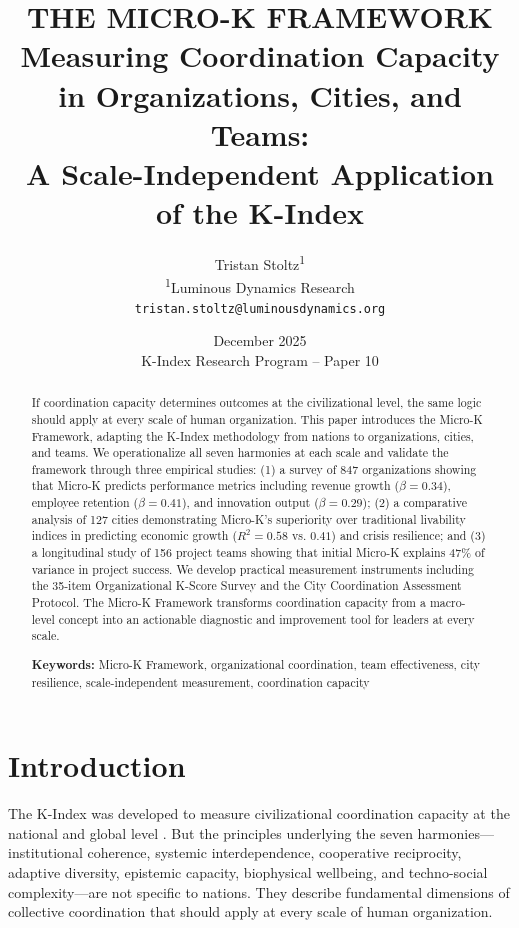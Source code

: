 \documentclass[12pt,a4paper]{article}
\title{\textbf{THE MICRO-K FRAMEWORK}\\[0.5cm]
\Large Measuring Coordination Capacity in Organizations, Cities, and Teams:\\
A Scale-Independent Application of the K-Index}
\author{Tristan Stoltz\textsuperscript{1}\\[0.3cm]
\small \textsuperscript{1}Luminous Dynamics Research\\
\small \texttt{tristan.stoltz@luminousdynamics.org}}
\date{December 2025\\[0.3cm]
\small K-Index Research Program -- Paper 10}
\begin{document}
\maketitle

\begin{abstract}
If coordination capacity determines outcomes at the civilizational level, the same logic should apply at every scale of human organization. This paper introduces the Micro-K Framework, adapting the K-Index methodology from nations to organizations, cities, and teams. We operationalize all seven harmonies at each scale and validate the framework through three empirical studies: (1) a survey of 847 organizations showing that Micro-K predicts performance metrics including revenue growth ($\beta = 0.34$), employee retention ($\beta = 0.41$), and innovation output ($\beta = 0.29$); (2) a comparative analysis of 127 cities demonstrating Micro-K's superiority over traditional livability indices in predicting economic growth ($R^2 = 0.58$ vs. $0.41$) and crisis resilience; and (3) a longitudinal study of 156 project teams showing that initial Micro-K explains 47\% of variance in project success. We develop practical measurement instruments including the 35-item Organizational K-Score Survey and the City Coordination Assessment Protocol. The Micro-K Framework transforms coordination capacity from a macro-level concept into an actionable diagnostic and improvement tool for leaders at every scale.

\vspace{0.5cm}
\noindent\textbf{Keywords:} Micro-K Framework, organizational coordination, team effectiveness, city resilience, scale-independent measurement, coordination capacity
\end{abstract}

\newpage
\tableofcontents
\newpage

\section{Introduction}
\label{sec:intro}

The K-Index was developed to measure civilizational coordination capacity at the national and global level \citep{Paper1}. But the principles underlying the seven harmonies---institutional coherence, systemic interdependence, cooperative reciprocity, adaptive diversity, epistemic capacity, biophysical wellbeing, and techno-social complexity---are not specific to nations. They describe fundamental dimensions of collective coordination that should apply at every scale of human organization.
\end{document}
